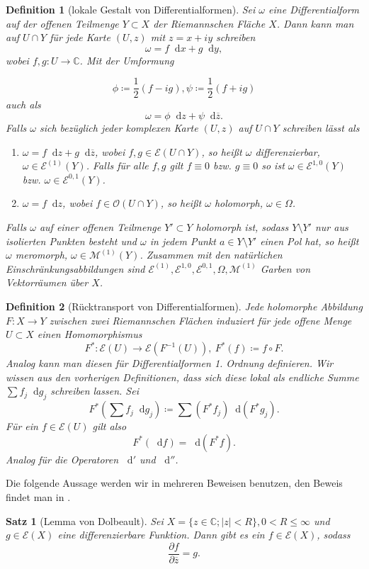 \documentclass[11pt,a4paper,toc=bibliography]{scrartcl}
\theoremstyle{thm}
\newtheorem{satz}{Satz}[section]
\theoremstyle{def}
\newtheorem{defi}{Definition}[section]
\theoremstyle{remark}
\newcommand*\dif{\mathop{}\!\mathrm{d}}\newcommand{\einschraenkung}{\,\rule[-5pt]{0.4pt}{12pt}\,{}} %
\begin{document}
\begin{defi}[lokale Gestalt von Differentialformen]
Sei $\omega $ eine Differentialform auf der offenen Teilmenge $Y\subset X$ der Riemannschen Fläche $X$. Dann kann man auf $U\cap Y$ für jede Karte $(U,z)$ mit $z=x+iy$ schreiben
\[
\omega = f\dif x+g\dif y,
\]
wobei $f,g:U\rightarrow \mathbb{C}$. Mit der Umformung

	\[
\phi \coloneqq \frac{1}{2}\left(f-ig\right), \psi \coloneqq \frac{1}{2}\left(f+ig\right)
\]  
auch als
\[
\omega = \phi\dif z+\psi\dif\overline{z}.
\]
Falls $\omega $ sich bezüglich jeder komplexen Karte $(U,z)$ auf $U\cap Y$ schreiben lässt als
\begin{enumerate}
	\item $\omega = f\dif z+g\dif \overline{z}$, wobei $f,g\in \mathcal{E}(U\cap Y)$, so heißt $\omega$ \emph{differenzierbar}, $\omega\in \mathcal{E}^{(1)}(Y)$. Falls für alle $f,g$ gilt $f\equiv 0$ bzw. $g\equiv 0$ so ist $\omega \in \mathcal{E}^{1,0}(Y)$ bzw. $\omega \in \mathcal{E}^{0,1}(Y)$.
	\item $\omega = f\dif z$, wobei $f\in\mathcal{O}(U\cap Y)$, so heißt $\omega$ \emph{holomorph},
	$\omega\in \Omega$.
\end{enumerate}
Falls $\omega$ auf einer offenen Teilmenge $Y'\subset Y$ holomorph ist, sodass $Y\setminus Y'$ nur aus isolierten Punkten besteht und $\omega$ in jedem Punkt $a\in Y\setminus Y'$ einen Pol hat, so heißt $\omega$ \emph{meromorph}, $\omega \in \mathcal{M}^{(1)}(Y)$.
Zusammen mit den natürlichen Einschränkungsabbildungen sind $\mathcal{E}^{(1)},\mathcal{E}^{1,0},\mathcal{E}^{0,1},\Omega,\mathcal{M}^{(1)} $ Garben von Vektorräumen über $X$.
\end{defi}

 \begin{defi}[Rücktransport von Differentialformen]
 	Jede holomorphe Abbildung $F:X\rightarrow Y$ zwischen zwei Riemannschen Flächen induziert für jede offene Menge $U\subset X$ einen Homomorphismus
 	\[
 	F^*:\mathcal{E}(U)\rightarrow \mathcal{E}(F^{-1}(U)),~F^*(f)\coloneqq f\circ F.
 	\]
 	Analog kann man diesen für Differentialformen 1. Ordnung definieren. Wir wissen aus den vorherigen Definitionen, dass sich diese lokal als endliche Summe $\sum f_j\dif g_j$ schreiben lassen. Sei
 	\[
 	F^*(\sum f_j\dif g_j)\coloneqq \sum (F^*f_j)\dif(F^*g_j).
 	\]
 	Für ein $f\in\mathcal{E}(U)$ gilt also
 	\[
 	F^*(\dif f) = \dif (F^*f).
 	\]
 	Analog für die Operatoren $\dif'$ und $\dif''$.
 \end{defi}
 Die folgende Aussage werden wir in mehreren Beweisen benutzen, den Beweis findet man in \cite[~S.97]{forster}.
 \begin{satz}[Lemma von Dolbeault]
   Sei $X=\{ z\in\mathbb{C}; |z|<R\},0<R\leq\infty$  und  $g\in\mathcal{E}(X)$ eine differenzierbare Funktion. Dann gibt es ein $f\in \mathcal{E}(X)$, sodass
   \[
   \frac{\partial f}{\partial \overline{z}}= g.
   \]
 \end{satz}
\end{document}

